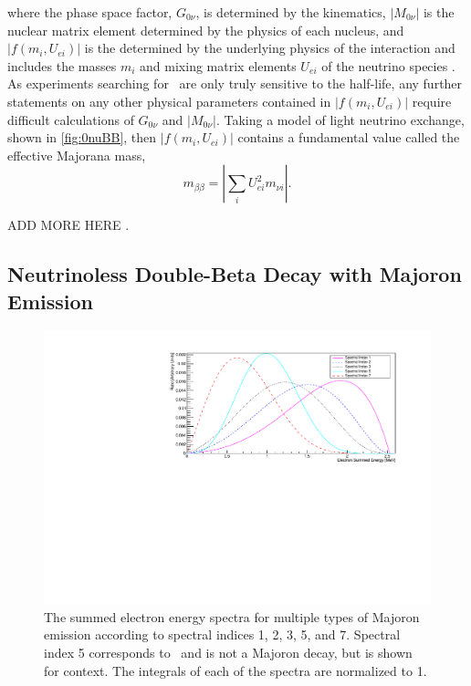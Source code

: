 where the phase space factor, $G_{0\nu}$, is determined by the kinematics, $|M_{0\nu}|$ is the nuclear matrix element determined by the physics of each nucleus, and $|f(m_i, U_{ei})|$ is the determined by the underlying physics of the interaction and includes the masses $m_i$ and mixing matrix elements $U_{ei}$ of the neutrino species \cite{Barea:2013bz}. As experiments searching for \zeronubb~are only truly sensitive to the half-life, any further statements on any other physical parameters contained in $|f(m_i, U_{ei})|$ require difficult calculations of $G_{0\nu}$ and $|M_{0\nu}|$. Taking a model of light neutrino exchange, shown in \autoref{fig:0nuBB}, then $|f(m_i, U_{ei})|$ contains a fundamental value called the effective Majorana mass, 
\begin{equation}
    m_{\beta\beta}=|\sum_iU^2_{ei}m_{\nu i}|.
\end{equation}

\color{red} ADD MORE HERE \color{black}.


\subsection{Neutrinoless Double-Beta Decay with Majoron Emission}
\label{ssec:Neutrinoless Double-Beta Decay with Majoron Emisison}

\begin{figure}
    \centering
    \includegraphics[width=0.8\linewidth]{Figures/EnergySpectrum.pdf}
    \caption[The summed electron energy spectra for multiple types of Majoron emission according to spectral indices 1, 2, 3, 5, and 7.]{The summed electron energy spectra for multiple types of Majoron emission according to spectral indices 1, 2, 3, 5, and 7. Spectral index 5 corresponds to \twonubb~and is not a Majoron decay, but is shown for context. The integrals of each of the spectra are normalized to 1.}
    \label{fig:Majoron Spectrum}
\end{figure}

